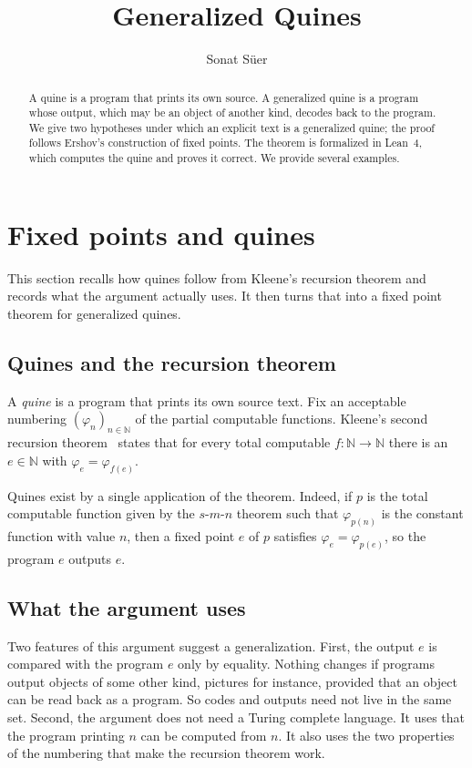 \documentclass[11pt]{amsart}
\title{Generalized Quines}
\author{Sonat S\"uer}
\date{}
\theoremstyle{definition}
\theoremstyle{remark}
\begin{document}
\begin{abstract}
A quine is a program that prints its own source. A generalized quine is a program whose output,
which may be an object of another kind, decodes back to the program. We give two hypotheses under
which an explicit text is a generalized quine; the proof follows Ershov's construction of fixed
points. The theorem is formalized in Lean~4, which computes the quine and proves it correct. We
provide
several examples.
\end{abstract}

\maketitle

\section{Fixed points and quines}\label{sec:motivation}

This section recalls how quines follow from Kleene's recursion theorem and records what the
argument actually uses. It then turns that into a fixed point theorem for generalized quines.

\subsection{Quines and the recursion theorem}

A \emph{quine} is a program that prints its own source text. Fix an acceptable numbering
$(\varphi_n)_{n \in \mathbb{N}}$ of the partial computable functions. Kleene's second recursion
theorem~\cite{Kleene38} states that for every total computable $f \colon \mathbb{N} \to
\mathbb{N}$ there is an $e \in \mathbb{N}$ with $\varphi_e = \varphi_{f(e)}$.

Quines exist by a single application of the theorem. Indeed, if $p$ is the total computable function
given by the $s$-$m$-$n$ theorem such that
$\varphi_{p(n)}$ is the constant function with value $n$, then a fixed point $e$ of $p$ satisfies
$\varphi_e = \varphi_{p(e)}$, so the program $e$ outputs $e$.

\subsection{What the argument uses}

Two features of this argument suggest a generalization. First, the output $e$ is compared with the
program $e$ only by equality. Nothing changes if programs output objects of some other kind,
pictures for instance, provided that an object can be read back as a program. So codes and outputs
need not live in the same set. Second, the argument does not need a Turing complete language. It
uses that the program printing $n$ can be computed from $n$. It also uses the two properties of
the numbering that make the recursion theorem work.
\end{document}
